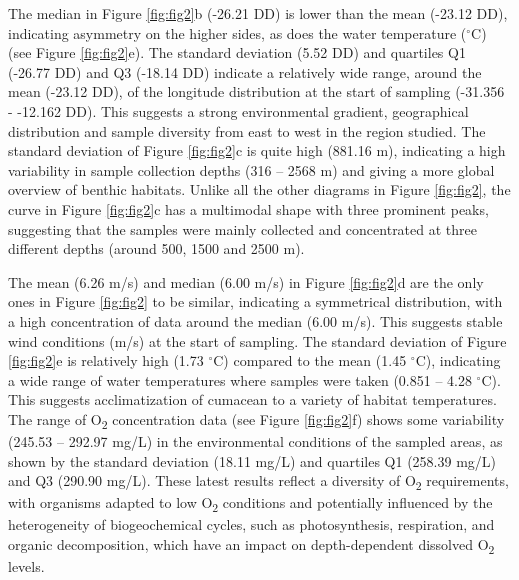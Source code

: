 The median in Figure \ref{fig:fig2}b (-26.21 DD) is lower than the mean (-23.12 DD), indicating asymmetry on the higher sides, as does the water temperature ($^\circ$C) (see Figure \ref{fig:fig2}e). The standard deviation (5.52 DD) and quartiles Q1 (-26.77 DD) and Q3 (-18.14 DD) indicate a relatively wide range, around the mean (-23.12 DD), of the longitude distribution at the start of sampling (-31.356 - -12.162 DD). This suggests a strong environmental gradient, geographical distribution and sample diversity from east to west in the region studied. The standard deviation of Figure \ref{fig:fig2}c is quite high (881.16 m), indicating a high variability in sample collection depths (316 – 2568 m) and giving a more global overview of benthic habitats. Unlike all the other diagrams in Figure \ref{fig:fig2}, the curve in Figure \ref{fig:fig2}c has a multimodal shape with three prominent peaks, suggesting that the samples were mainly collected and concentrated at three different depths (around 500, 1500 and 2500 m).

The mean (6.26 m/s) and median (6.00 m/s) in Figure \ref{fig:fig2}d are the only ones in Figure \ref{fig:fig2} to be similar, indicating a symmetrical distribution, with a high concentration of data around the median (6.00 m/s). This suggests stable wind conditions (m/s) at the start of sampling. The standard deviation of Figure \ref{fig:fig2}e is relatively high (1.73 $^\circ$C) compared to the mean (1.45 $^\circ$C), indicating a wide range of water temperatures where samples were taken (0.851 – 4.28 $^\circ$C). This suggests acclimatization of cumacean to a variety of habitat temperatures. The range of O\textsubscript{2} concentration data (see Figure \ref{fig:fig2}f) shows some variability (245.53 – 292.97 mg/L) in the environmental conditions of the sampled areas, as shown by the standard deviation (18.11 mg/L) and quartiles Q1 (258.39 mg/L) and Q3 (290.90 mg/L). These latest results reflect a diversity of O\textsubscript{2} requirements, with organisms adapted to low O\textsubscript{2} conditions and potentially influenced by the heterogeneity of biogeochemical cycles, such as photosynthesis, respiration, and organic decomposition, which have an impact on depth-dependent dissolved  O\textsubscript{2} levels.

